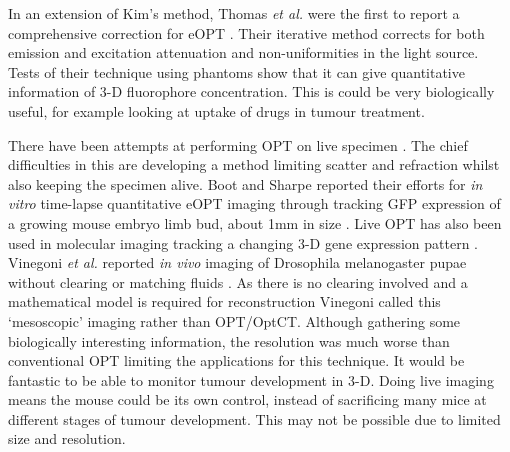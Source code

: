 In an extension of Kim's method, Thomas \textit{et al.} were the first to report a comprehensive correction for  eOPT \cite{Thomas:2010gt}. Their iterative method corrects for both emission and excitation attenuation and non-uniformities in the light source. 
Tests of their technique using phantoms show that it can give quantitative information of 3-D fluorophore concentration. This is could be very biologically useful, for example looking at uptake of drugs in tumour treatment. 

  




There have been attempts at performing OPT  on live specimen \cite{Boot:2008dt, Vinegoni:2008ix, Colas:2009}. The chief difficulties in this are developing a method limiting scatter and refraction  whilst also keeping the specimen alive. Boot and Sharpe reported their efforts for \textit{in vitro} time-lapse quantitative eOPT  imaging through tracking GFP expression of a growing mouse embryo limb bud, about 1mm in size \cite{Boot:2008dt}. 
Live OPT has also been used in molecular imaging tracking a changing 3-D gene expression pattern \cite{Colas:2009}.
Vinegoni \textit{et al.} reported \textit{in vivo} imaging of Drosophila melanogaster pupae without clearing or matching fluids \cite{Vinegoni:2008ix}.  As there is no clearing involved and a mathematical model is required for reconstruction Vinegoni called this `mesoscopic' imaging rather than OPT/OptCT.  
Although gathering some biologically interesting information, the resolution was much worse than conventional OPT limiting the applications for this technique. It would be fantastic to be able to monitor tumour development in 3-D. Doing live imaging means the mouse could be its own control, instead of sacrificing many mice at different stages of tumour development. This may not be possible due to limited size and resolution.










